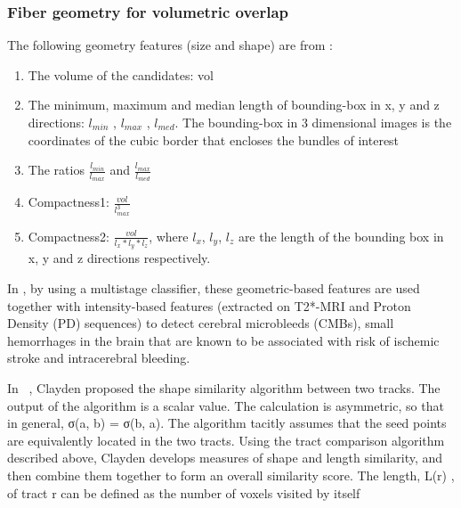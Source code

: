 \subsubsection{Fiber geometry 
for volumetric overlap}
\label{subsec:experiments_quatification_geometry}
The following geometry features (size and shape) are from \cite{babak2012computer}:
\begin{enumerate}
	\item The volume of the candidates: vol 
	\item The minimum, maximum and median length of bounding-box in x, y and z directions: $l_{min}$ , $l_{max}$ , $l_{med}$. The bounding-box in 3 dimensional images is the coordinates of the cubic border that encloses the bundles of interest
	\item The ratios   $\frac{l_{min}}{l_{max}}$ and $\frac{l_{max}}{l_{med}}$ 
	\item Compactness1: $\frac{vol}{l_{max}^3}$
	\item Compactness2: $\frac{vol}{l_{x}\ast l_{y}\ast l_{z}}$, where $l_{x}$, $l_{y}$, $l_{z}$ are the length of the bounding box in x, y and z directions respectively.
\end{enumerate}

In \cite{babak2012computer}, by using a multistage classifier, these geometric-based features
are used together with intensity-based features (extracted on T2*-MRI and Proton Density (PD) sequences) to detect cerebral microbleeds (CMBs), small hemorrhages in the brain that are known to be associated with risk of ischemic stroke and intracerebral bleeding. 

In ~\cite{clayden2008comparative}, Clayden proposed the shape similarity algorithm between two tracks. The output of the algorithm is a scalar value. The calculation is asymmetric, so that in general, σ(a, b) = σ(b, a). The algorithm tacitly assumes that the seed points are equivalently located in the two tracts. Using the tract comparison algorithm described above, Clayden develops measures of shape and length similarity, and then combine them together to form an overall similarity score. The length, L(r) , of tract r can be defined as the number of voxels visited by itself

